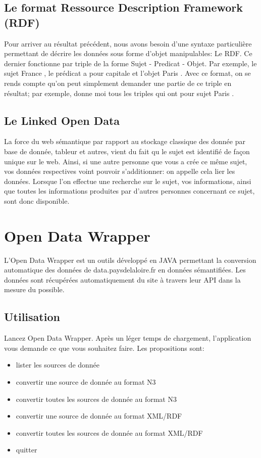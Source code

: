 \documentclass[a4paper]{article}
\begin{document}
\subsection{Le format Ressource Description Framework (RDF)}

Pour arriver au résultat précédent, nous avons besoin d'une syntaxe particulière
permettant de décrire les données sous forme d'objet manipulables: Le RDF. Ce
dernier fonctionne par triple de la forme Sujet - Predicat - Objet. Par exemple,
le sujet \og{} France \fg{} , le prédicat \og{} a pour capitale \fg{} et l'objet
\og{} Paris \fg{}. Avec ce format, on se rends compte qu'on peut simplement
demander une partie de ce triple en résultat; par exemple, donne moi tous les
triples qui ont pour sujet \og{} Paris \fg{}.


\subsection{Le Linked Open Data}

La force du web sémantique par rapport au stockage classique des donnée par base
de donnée, tableur et autres, vient du fait qu le sujet est identifié de façon
unique sur le web. Ainsi, si une autre personne que vous a crée ce même sujet,
vos données respectives voint pouvoir s'additionner: on appelle cela lier les
données. Lorsque l'on effectue une recherche sur le sujet, vos informations,
ainsi que toutes les informations produites par d'autres personnes concernant ce
sujet, sont donc disponible.

\section{Open Data Wrapper}

L'Open Data Wrapper est un outils développé en JAVA permettant la conversion
automatique des données de data.paysdelaloire.fr en données sémantifiées. Les
données sont récupérées automatiquement du site à travers leur API dans la
mesure du possible.

\subsection{Utilisation}

Lancez Open Data Wrapper. Après un léger temps de chargement, l'application vous
demande ce que vous souhaitez faire. Les propositions sont:
\begin{itemize}
\item lister les sources de donnée
\item convertir une source de donnée au format N3
\item convertir toutes les sources de donnée au format N3
\item convertir une source de donnée au format XML/RDF
\item convertir toutes les sources de donnée au format XML/RDF
\item quitter
\end{itemize}
\end{document}

